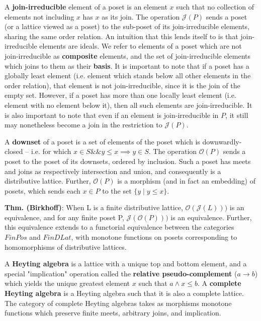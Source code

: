 \documentclass[hoptionsi,review,format=sigplan]{acmart}
\theoremstyle{definition}
\newcommand{\Oc}{\mathcal{O}}
\newcommand{\Jc}{\mathcal{J}}
\begin{document}
A \textbf{join-irreducible} element of a poset is an element \(x\) such that no collection of elements not including \(x\) has \(x\) as its join. The operation \(\Jc(P)\) sends a poset (or a lattice viewed as a poset) to the sub-poset of its join-irreducible elements, sharing the same order relation. An intuition that this lends itself to is that join-irreducible elements are ideals. We refer to elements of a poset which are not join-irreducible as \textbf{composite} elements, and the set of join-irreducible elements which joins to them as their \textbf{basis}. It is important to note that if a poset has a globally least element (i.e. element which stands below all other elements in the order relation), that element is not join-irreducible, since it is the join of the empty set. However, if a poset has more than one locally least element (i.e. element with no element below it), then all such elements are join-irreducible. It is also important to note that even if an element is join-irreducible in \(P\), it still may nonetheless become a join in the restriction to \(\Jc(P)\).

A \textbf{downset} of a poset is a set of elements of the poset which is downwardly-closed -- i.e. for which \(x \in S \mathbin{\&\&} y \le x \implies y \in S\). The operation \(\Oc(P)\) sends a poset to the poset of its downsets, ordered by inclusion. Such a poset has meets and joins as respectively intersection and union, and consequently is a distributive lattice. Further, \(\Oc(P)\) is a morphism (and in fact an embedding) of posets, which sends each \(x \in P\) to the set \(\{y \mathbin{|} y \le x\}\).

\textbf{Thm. (Birkhoff)}: When L is a finite distributive lattice, \(\Oc(\Jc(L)))\) is an equivalence, and for any finite poset P,  \(\Jc(\Oc(P)))\) is an equivalence. Further, this equivalence extends to a functorial equivalence between the categories \(FinPos\) and \(FinDLat\), with monotone functions on posets corresponding to homomorphisms of distributive lattices.

A \textbf{Heyting algebra} is a lattice with a unique top and bottom element, and a special "implication" operation called the \textbf{relative pseudo-complement} (\(a \rightarrow b\)) which yields the unique greatest element \(x\) such that \(a \wedge x \le b\). A \textbf{complete Heyting algebra} is a Heyting algebra such that it is also a complete lattice. The category of complete Heyting algebras takes as morphisms monotone functions which preserve finite meets, arbitrary joins, and implication.
\end{document}
